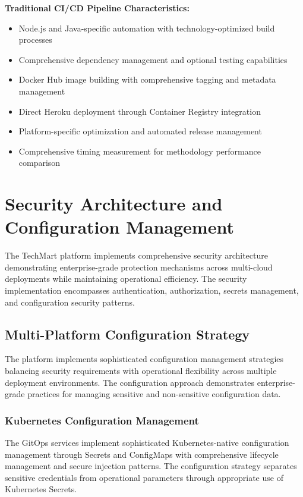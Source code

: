 \textbf{Traditional CI/CD Pipeline Characteristics:}
\begin{itemize}
\item Node.js and Java-specific automation with technology-optimized build processes
\item Comprehensive dependency management and optional testing capabilities
\item Docker Hub image building with comprehensive tagging and metadata management
\item Direct Heroku deployment through Container Registry integration
\item Platform-specific optimization and automated release management
\item Comprehensive timing measurement for methodology performance comparison
\end{itemize}

\section{Security Architecture and Configuration Management}

The TechMart platform implements comprehensive security architecture demonstrating enterprise-grade protection mechanisms across multi-cloud deployments while maintaining operational efficiency. The security implementation encompasses authentication, authorization, secrets management, and configuration security patterns.

\subsection{Multi-Platform Configuration Strategy}

The platform implements sophisticated configuration management strategies balancing security requirements with operational flexibility across multiple deployment environments. The configuration approach demonstrates enterprise-grade practices for managing sensitive and non-sensitive configuration data.

\subsubsection{Kubernetes Configuration Management}

The GitOps services implement sophisticated Kubernetes-native configuration management through Secrets and ConfigMaps with comprehensive lifecycle management and secure injection patterns. The configuration strategy separates sensitive credentials from operational parameters through appropriate use of Kubernetes Secrets.

